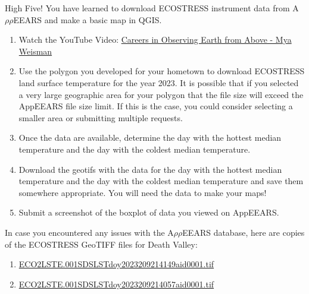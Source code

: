 \documentclass[oneside,a4paper,11pt,explicit]{book}
\begin{document}
High Five! You have learned to download ECOSTRESS instrument data from A$\rho\rho$EEARS and make a basic map in QGIS.

\begin{tcolorbox}[colback=yellow!5!white,colframe=MACred,title= \vspace{.2em} \Large Make a Map Assignments]
	\large
	\begin{enumerate}
  \item Watch the YouTube Video: 
\href{https://www.youtube.com/watch?v=ridkaPrRpiA}{Careers in Observing Earth from Above - Mya Weisman}

  
  \item  Use the polygon you developed for your hometown to download ECOSTRESS land surface temperature for the year 2023. It is possible that if you selected a very large geographic area for your polygon that the file size will exceed the AppEEARS file size limit. If this is the case, you could consider selecting a smaller area or submitting multiple requests.

  \item Once the data are available, determine the day with the hottest median temperature and the day with the coldest median temperature. 

  \item Download the geotifs with the data for the day with the hottest median temperature and the day with the coldest median temperature and save them somewhere appropriate. You will need the data to make your maps!

  \item Submit a screenshot of the boxplot of data you viewed on AppEEARS.  
	\end{enumerate}
\end{tcolorbox}

\begin{tcolorbox}[colback=yellow!5!white,title=\textbf{Datafiles}]
	\large
	In case you encountered any issues with the A$\rho\rho$EEARS database, here are copies of the ECOSTRESS GeoTIFF files for Death Valley:
	\begin{enumerate}
		\item \href{https://jeremydforsythe.github.io/icecream-tutorials/Tutorial5_AccessingRemoteSensingDataWithAppears/ECO2LSTE.001_SDS_LST_doy2023209214149_aid0001.tif}{\small ECO2LSTE.001\textunderscore SDS\textunderscore LST\textunderscore doy2023209214149\textunderscore aid0001.tif}
		\item \href{https://jeremydforsythe.github.io/icecream-tutorials/Tutorial5_AccessingRemoteSensingDataWithAppears/ECO2LSTE.001_SDS_LST_doy2023209214057_aid0001.tif}{\small ECO2LSTE.001\textunderscore SDS\textunderscore LST\textunderscore doy2023209214057\textunderscore aid0001.tif}
	\end{enumerate}
\end{tcolorbox}
\end{document}
